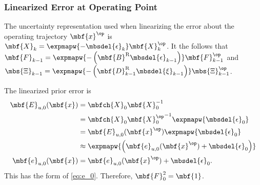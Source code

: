 \subsubsection{Linearized Error at Operating Point}

The uncertainty representation used when linearizing the error about the operating trajectory $\mbf{x}^\op$ is $\mbf{X}_k = \expmapw{-\mbsdel{\epsilon}_k}\mbf{X}_k^\op$. It the follows that $\mbf{F}_{k-1} = \expmapw{-\left(\mbf{B}^\textrm{R}\mbsdel{\epsilon}_{k-1}\right)}\mbf{F}_{k-1}^\op$ and $\mbs{\Xi}_{k-1} = \expmapw{-\left(\mbf{D}_{k-1}^\textrm{R}\mbsdel{\xi}_{k-1}\right)}\mbs{\Xi}_{k-1}^\op$.

The linearized prior error is 
\begin{align*}
	\mbf{E}_{u,0}(\mbf{x}) &= \mbfch{X}_0\mbf{X}_0^{-1} \\
	&= \mbfch{X}_0{\mbf{X}_0^\op}^{-1}\expmapw{\mbsdel{\epsilon}_0} \\
	&= \mbf{E}_{u,0}(\mbf{x}^\op)\expmapw{\mbsdel{\epsilon}_0} \\
	&\approx\expmapw {\left(\mbf{e}_{u,0}(\mbf{x}^\op) + \mbsdel{\epsilon}_0\right)} \\
	\mbf{e}_{u,0}(\mbf{x}) &= \mbf{e}_{u,0}(\mbf{x}^\op) +\mbsdel{\epsilon}_0.
\end{align*}
This has the form of \eqref{eq:e_0}. Therefore, $\mbf{F}_0^2 = \mbf{1}$.

